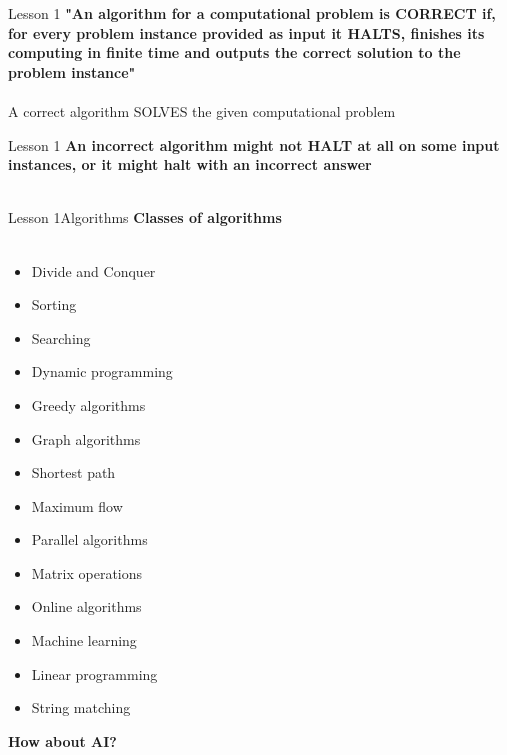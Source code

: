 \documentclass[aspectratio=1610]{beamer}
\begin{document}
\begin{frame}{Lesson 1}{}
\LARGE
\textbf {"An algorithm for a computational problem is CORRECT if, for every problem instance provided as input it HALTS, finishes its computing  in finite time and outputs the correct solution to the problem instance"\\~\\}
A correct algorithm SOLVES the given computational problem

\end{frame}



\begin{frame}{Lesson 1}{}
\LARGE
\textbf {An incorrect algorithm might not HALT at all on some input instances, or it might halt with an incorrect answer\\~\\}
\end{frame}



\begin{frame}{Lesson 1}{Algorithms}
\Large
\textbf{Classes of algorithms}\\~\\ 
    \begin{multicols}{3}
    \begin{itemize}
        \item Divide and Conquer
        \item Sorting
        \item Searching
        \item Dynamic programming
        \item Greedy algorithms
        \item Graph algorithms
        \item Shortest path
        \item Maximum flow
        \item Parallel algorithms
        \item Matrix operations
        \item Online algorithms
        \item Machine learning
        \item Linear programming
        \item String matching
    \end{itemize}
    \end{multicols}
\end{frame}


\begin{frame}
\begin{center}
\Huge 
\textbf { How about AI? }
\end{center}
\end{frame}
\end{document}
